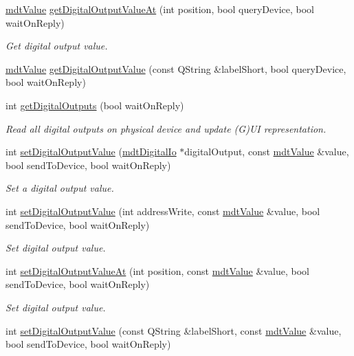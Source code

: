 \begin{DoxyCompactItemize}
\hyperlink{classmdt_value}{mdt\-Value} \hyperlink{classmdt_device_abdd55e5a7bbfe268fc3c790e81da373a}{get\-Digital\-Output\-Value\-At} (int position, bool query\-Device, bool wait\-On\-Reply)
\begin{DoxyCompactList}\small\item\em Get digital output value. \end{DoxyCompactList}\item 
\hyperlink{classmdt_value}{mdt\-Value} \hyperlink{classmdt_device_a5e7b7de4243f45d8cfa42599d51555bf}{get\-Digital\-Output\-Value} (const Q\-String \&label\-Short, bool query\-Device, bool wait\-On\-Reply)
\item 
int \hyperlink{classmdt_device_ab35b81b8eb68e161ac06ae882be39a25}{get\-Digital\-Outputs} (bool wait\-On\-Reply)
\begin{DoxyCompactList}\small\item\em Read all digital outputs on physical device and update (G)U\-I representation. \end{DoxyCompactList}\item 
int \hyperlink{classmdt_device_ad3c5aefa261a7ef8d27c2d5012886369}{set\-Digital\-Output\-Value} (\hyperlink{classmdt_digital_io}{mdt\-Digital\-Io} $\ast$digital\-Output, const \hyperlink{classmdt_value}{mdt\-Value} \&value, bool send\-To\-Device, bool wait\-On\-Reply)
\begin{DoxyCompactList}\small\item\em Set a digital output value. \end{DoxyCompactList}\item 
int \hyperlink{classmdt_device_a5c2514c3c31a687a01a898c874d2c45e}{set\-Digital\-Output\-Value} (int address\-Write, const \hyperlink{classmdt_value}{mdt\-Value} \&value, bool send\-To\-Device, bool wait\-On\-Reply)
\begin{DoxyCompactList}\small\item\em Set digital output value. \end{DoxyCompactList}\item 
int \hyperlink{classmdt_device_a6b906f01f6b0bdc8586df09a872173ef}{set\-Digital\-Output\-Value\-At} (int position, const \hyperlink{classmdt_value}{mdt\-Value} \&value, bool send\-To\-Device, bool wait\-On\-Reply)
\begin{DoxyCompactList}\small\item\em Set digital output value. \end{DoxyCompactList}\item 
int \hyperlink{classmdt_device_a2377d24cc1e767a24dfc5e34454a8737}{set\-Digital\-Output\-Value} (const Q\-String \&label\-Short, const \hyperlink{classmdt_value}{mdt\-Value} \&value, bool send\-To\-Device, bool wait\-On\-Reply)

\end{DoxyCompactItemize}
